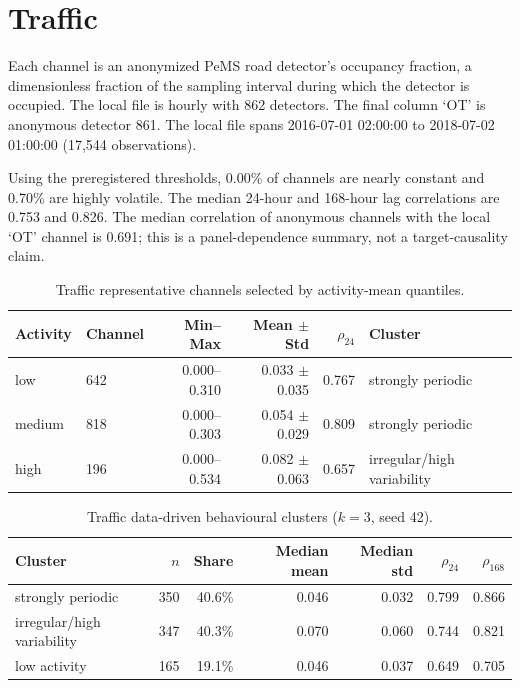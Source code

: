 \documentclass[10pt]{article}
\begin{document}
\section{Traffic}

Each channel is an anonymized PeMS road detector's occupancy fraction, a dimensionless fraction of the sampling interval during which the detector is occupied. The local file is hourly with 862 detectors. The final column `OT' is anonymous detector 861. The local file spans 2016-07-01 02:00:00 to 2018-07-02 01:00:00 (17,544 observations).

Using the preregistered thresholds, 0.00\% of channels are nearly constant and 0.70\% are highly volatile. The median 24-hour and 168-hour lag correlations are 0.753 and 0.826. The median correlation of anonymous channels with the local `OT' channel is 0.691; this is a panel-dependence summary, not a target-causality claim.

\begin{table}[ht]\centering\small
\caption{Traffic representative channels selected by activity-mean quantiles.}\label{tab:traffic-reps}
\begin{tabular}{llrrrl}
\toprule
Activity & Channel & Min--Max & Mean $\pm$ Std & $\rho_{24}$ & Cluster \\
\midrule
low & 642 & 0.000--0.310 & 0.033 $\pm$ 0.035 & 0.767 & strongly periodic \\
medium & 818 & 0.000--0.303 & 0.054 $\pm$ 0.029 & 0.809 & strongly periodic \\
high & 196 & 0.000--0.534 & 0.082 $\pm$ 0.063 & 0.657 & irregular/high variability \\
\bottomrule
\end{tabular}
\end{table}

\begin{table}[ht]\centering\small
\caption{Traffic data-driven behavioural clusters ($k=3$, seed 42).}\label{tab:traffic-clusters}
\begin{tabular}{lrrrrrr}
\toprule
Cluster & $n$ & Share & Median mean & Median std & $\rho_{24}$ & $\rho_{168}$ \\
\midrule
strongly periodic & 350 & 40.6\% & 0.046 & 0.032 & 0.799 & 0.866 \\
irregular/high variability & 347 & 40.3\% & 0.070 & 0.060 & 0.744 & 0.821 \\
low activity & 165 & 19.1\% & 0.046 & 0.037 & 0.649 & 0.705 \\
\bottomrule
\end{tabular}
\end{table}
\end{document}

